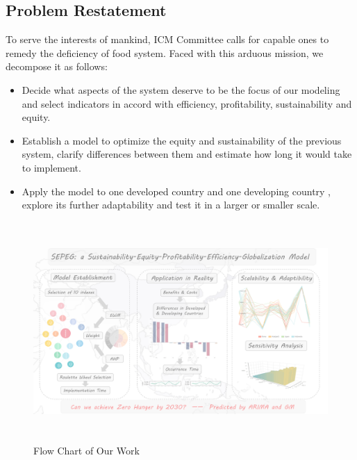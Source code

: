 \documentclass{mcmthesis}
\begin{document}
\subsection{Problem Restatement}
 To serve the interests of mankind, ICM Committee calls for capable ones to remedy the deficiency of food system. Faced with this arduous mission, we decompose it as follows:
 \begin{itemize}
     \item Decide what aspects of the system deserve to be the focus of our modeling and select indicators in accord with efficiency, profitability, sustainability and equity.
     \item Establish a model to optimize the equity and sustainability of the previous system, clarify differences between them and estimate how long it would take to implement.
     \item Apply the model to one developed country and one developing country , explore its further adaptability and test it in a larger or smaller scale.
 \end{itemize}
  

\begin{figure}[H]
	\centering
	\includegraphics[height=8.34cm]{flowchart.png} 
	\caption{Flow Chart of Our Work}
	\label{fig:eg1}
\end{figure}
\end{document}
